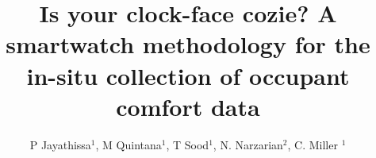 \documentclass[a4paper]{jpconf} %
\begin{document}



\title{Is your clock-face cozie? A smartwatch methodology for the in-situ collection of occupant comfort data} 

\author{P Jayathissa$^1$, M Quintana$^1$,
T Sood$^1$, N. Narzarian$^2$, C. Miller $^1$}
\address{$^1$ Building and Urban Data Science Group, National University of Singapore (NUS), Singapore}
\address{$^2$ University of New South Wales (UNSW), Australia}










\end{document}
